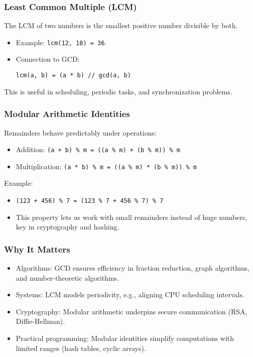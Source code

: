 \documentclass[
  letterpaper,
  DIV=11,
  numbers=noendperiod]{scrreprt}
\providecommand{\tightlist}{%
  \setlength{\itemsep}{0pt}\setlength{\parskip}{0pt}}
\begin{document}
\subsubsection{Least Common Multiple
(LCM)}\label{least-common-multiple-lcm}

The LCM of two numbers is the smallest positive number divisible by
both.

\begin{itemize}
\item
  Example: \texttt{lcm(12,\ 18)\ =\ 36}.
\item
  Connection to GCD:

\begin{verbatim}
lcm(a, b) = (a * b) // gcd(a, b)
\end{verbatim}
\end{itemize}

This is useful in scheduling, periodic tasks, and synchronization
problems.

\subsubsection{Modular Arithmetic
Identities}\label{modular-arithmetic-identities}

Remainders behave predictably under operations:

\begin{itemize}
\tightlist
\item
  Addition:
  \texttt{(a\ +\ b)\ \%\ m\ =\ ((a\ \%\ m)\ +\ (b\ \%\ m))\ \%\ m}
\item
  Multiplication:
  \texttt{(a\ *\ b)\ \%\ m\ =\ ((a\ \%\ m)\ *\ (b\ \%\ m))\ \%\ m}
\end{itemize}

Example:

\begin{itemize}
\tightlist
\item
  \texttt{(123\ +\ 456)\ \%\ 7\ =\ (123\ \%\ 7\ +\ 456\ \%\ 7)\ \%\ 7}
\item
  This property lets us work with small remainders instead of huge
  numbers, key in cryptography and hashing.
\end{itemize}

\subsubsection{Why It Matters}\label{why-it-matters-7}

\begin{itemize}
\tightlist
\item
  Algorithms: GCD ensures efficiency in fraction reduction, graph
  algorithms, and number-theoretic algorithms.
\item
  Systems: LCM models periodicity, e.g., aligning CPU scheduling
  intervals.
\item
  Cryptography: Modular arithmetic underpins secure communication (RSA,
  Diffie-Hellman).
\item
  Practical programming: Modular identities simplify computations with
  limited ranges (hash tables, cyclic arrays).
\end{itemize}
\end{document}

